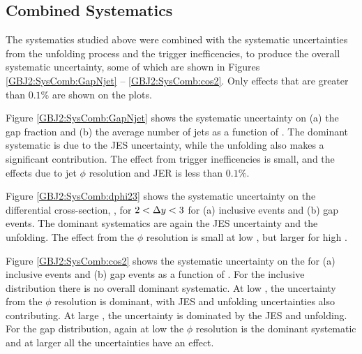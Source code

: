 \subsection{Combined Systematics}
\label{sec:GBJ2:SysComb}

The systematics studied above were combined  with the systematic uncertainties from the unfolding process and the trigger inefficencies, to produce the overall systematic uncertainty, some of which are shown in Figures \ref{GBJ2:SysComb:GapNjet} -- \ref{GBJ2:SysComb:cos2}.
Only effects that are greater than $0.1\%$ are shown on the plots.

Figure \ref{GBJ2:SysComb:GapNjet} shows the systematic uncertainty on (a) the gap fraction and (b) the average number of jets as a function of \dy{}.
The dominant systematic is due to the JES uncertainty, while the unfolding also makes a significant contribution. 
The effect from trigger inefficencies is small, and the effects due to jet $\phi$ resolution and JER is less than $0.1\%$.


Figure \ref{GBJ2:SysComb:dphi23} shows the systematic uncertainty on the differential cross-section, \dphiDist, for $2<\mbox{$\Delta y$}{}<3$ for (a) inclusive events and (b) gap events.
The dominant systematics are again the JES uncertainty and the unfolding. 
The effect from the $\phi$ resolution is small at low \dphi{}, but larger for high \dphi{}.

Figure \ref{GBJ2:SysComb:cos2} shows the systematic uncertainty on the \mean{\costwodphi{}} for (a) inclusive events and (b) gap events as a function of \dy{}.
For the inclusive distribution there is no overall dominant systematic. 
At low \dy{}, the uncertainty from the $\phi$ resolution is dominant, with JES and unfolding uncertainties also contributing.
At large \dy{}, the uncertainty is dominated by the JES and unfolding.
For the gap distribution, again at low \dy{} the $\phi$ resolution is the dominant systematic and at larger \dy{} all the uncertainties have an effect. 

